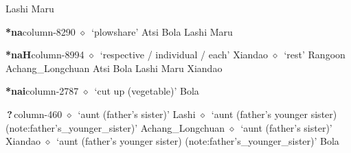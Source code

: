          Lashi 
\hspace{1ex}
         Maru 
  \item {\footnotesize \textbf{*na}}{\tiny column-8290}
         $\diamond$~`plowshare'
         Atsi 
\hspace{1ex}
         Bola 
\hspace{1ex}
         Lashi 
\hspace{1ex}
         Maru 
  \item {\footnotesize \textbf{*naH}}{\tiny column-8994}
         $\diamond$~`respective / individual / each'
         Xiandao 
\hspace{1ex}
         $\diamond$~`rest'
         Rangoon 
\hspace{1ex}
         Achang\_Longchuan 
\hspace{1ex}
         Atsi 
\hspace{1ex}
         Bola 
\hspace{1ex}
         Lashi 
\hspace{1ex}
         Maru 
\hspace{1ex}
         Xiandao 
  \item {\footnotesize \textbf{*nai}}{\tiny column-2787}
         $\diamond$~`cut up (vegetable)'
         Bola 
  \item {\footnotesize \textbf{\,?\,}}{\tiny column-460}
         $\diamond$~`aunt (father's sister)'
         Lashi 
\hspace{1ex}
         $\diamond$~`aunt (father's younger sister) (note:father's_younger_sister)'
         Achang\_Longchuan 
\hspace{1ex}
         $\diamond$~`aunt (father's sister)'
         Xiandao 
\hspace{1ex}
         $\diamond$~`aunt (father's younger sister) (note:father's_younger_sister)'
         Bola 
\hspace{1ex}
